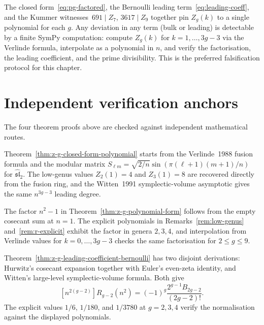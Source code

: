 \begin{remark}
\label{rem:falsification-test}
The closed form~\eqref{eq:pg-factored}, the Bernoulli leading
term~\eqref{eq:leading-coeff}, and the Kummer witnesses~$691 \mid Z_7$,
$3617 \mid Z_9$ together pin $Z_g(k)$ to a single polynomial for
each $g$. Any deviation in any term (bulk or leading) is detectable by a
finite SymPy computation: compute $Z_g(k)$ for $k = 1, \ldots, 3g-3$ via the
Verlinde formula, interpolate as a polynomial in $n$, and verify the
factorisation, the leading coefficient, and the prime divisibility. This is
the preferred falsification protocol for this chapter.
\end{remark}

\section{Independent verification anchors}
\label{sec:zg-independent-verification}

The four theorem proofs above are checked against independent mathematical
routes.

\begin{remark}
\label{rem:zg-verify-closed-form}
Theorem~\ref{thm:z-g-closed-form-polynomial} starts from the
Verlinde~1988 fusion formula and the modular matrix
$S_{\ell m}=\sqrt{2/n}\sin(\pi(\ell+1)(m+1)/n)$ for
$\widehat{\mathfrak{sl}}_2$. The low-genus values
$Z_2(1)=4$ and $Z_3(1)=8$ are recovered directly from the fusion ring, and
the Witten~1991 symplectic-volume asymptotic gives the same
$n^{3g-3}$ leading degree.
\end{remark}

\begin{remark}
\label{rem:zg-verify-polynomial}
The factor $n^2-1$ in Theorem~\ref{thm:z-g-polynomial-form} follows from
the empty cosecant sum at $n=1$. The explicit polynomials
in Remarks~\ref{rem:low-genus} and~\ref{rem:r-explicit} exhibit the
factor in genera $2,3,4$, and interpolation from Verlinde values for
$k=0,\ldots,3g-3$ checks the same factorisation for $2\leq g\leq9$.
\end{remark}

\begin{remark}
\label{rem:zg-verify-leading}
Theorem~\ref{thm:z-g-leading-coefficient-bernoulli} has two disjoint
derivations: Hurwitz's cosecant expansion together with Euler's
even-zeta identity, and Witten's large-level symplectic-volume formula.
Both give
\[
 [n^{2(g-2)}]R_{g-2}(n^2)
 =
 (-1)^g\frac{2^{g-1}B_{2g-2}}{(2g-2)!}.
\]
The explicit values $1/6$, $1/180$, and $1/3780$ at $g=2,3,4$ verify
the normalisation against the displayed polynomials.
\end{remark}

